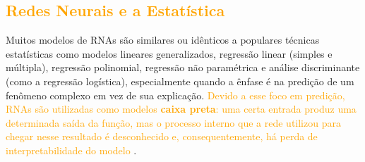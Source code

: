 \documentclass{automatextcc}
\newcommand{\nico}[1]{\textcolor{orange}{#1}}
\begin{document}
\subsection{\nico{Redes Neurais e a Estatística}}
Muitos modelos de RNAs são similares ou idênticos a populares técnicas estatísticas como modelos lineares generalizados, regressão linear (simples e múltipla), regressão polinomial, regressão não paramétrica e análise discriminante (como a regressão logística), especialmente quando a ênfase é na predição de um fenômeno complexo em vez de sua explicação. \nico{Devido a esse foco em predição, RNAs são utilizadas como modelos \textbf{caixa preta}: uma certa entrada produz uma determinada saída da função, mas o processo interno que a rede utilizou para chegar nesse resultado é desconhecido e, consequentemente, há perda de interpretabilidade do modelo \citep{sarle1994, cheng1994, rojas1996}}.
\end{document}
